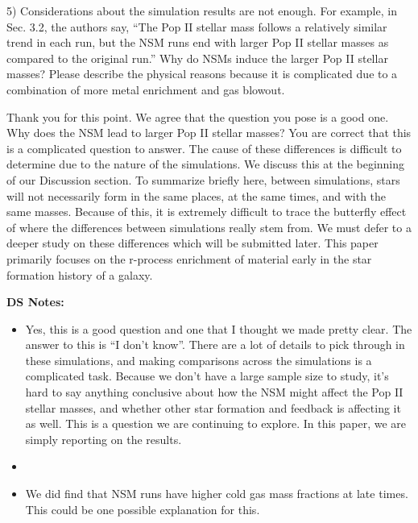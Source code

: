 \documentclass[11pt]{article}
\begin{document}
\begin{tcolorbox}[colback={lightgray}] 
    5)      Considerations about the simulation results are not enough. For example, in Sec. 3.2, the authors say, “The Pop II stellar mass follows a relatively similar trend in each run, but the NSM runs end with larger Pop II stellar masses as compared to the original run.” Why do NSMs induce the larger Pop II stellar masses? Please describe the physical reasons because it is complicated due to a combination of more metal enrichment and gas blowout.
\end{tcolorbox}

Thank you for this point. We agree that the question you pose is a good one. Why does the NSM lead to larger Pop II stellar masses? You are correct that this is a complicated question to answer. The cause of these differences is difficult to determine due to the nature of the simulations. We discuss this at the beginning of our Discussion section. To summarize briefly here, between simulations, stars will not necessarily form in the same places, at the same times, and with the same masses. Because of this, it is extremely difficult to trace the butterfly effect of where the differences between simulations really stem from. We must defer to a deeper study on these differences which will be submitted later. This paper primarily focuses on the r-process enrichment of material early in the star formation history of a galaxy.

\textbf{DS Notes:}
\begin{itemize}
    \item Yes, this is a good question and one that I thought we made pretty clear. The answer to this is ``I don't know''. There are a lot of details to pick through in these simulations, and making comparisons across the simulations is a complicated task. Because we don't have a large sample size to study, it's hard to say anything conclusive about how the NSM might affect the Pop II stellar masses, and whether other star formation and feedback is affecting it as well. This is a question we are continuing to explore. In this paper, we are simply reporting on the results.
    \item {}
    \item We did find that NSM runs have higher cold gas mass fractions at late times. This could be one possible explanation for this.
\end{itemize}
\end{document}
